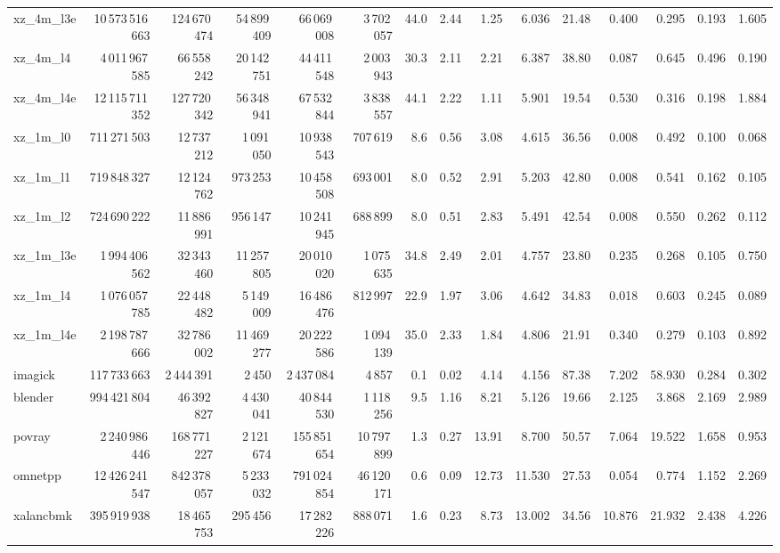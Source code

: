 \documentclass[9pt,landscape,a4paper]{article}
\begin{document}
\begin{adjustbox}{max width=\textwidth, max totalheight=0.50\textheight}
\begin{tabular}{lrrrrrrrrrrrrrr}
xz\_4m\_l3e & 10\,573\,516\,663 & 124\,670\,474 & 54\,899\,409 & 66\,069\,008 & 3\,702\,057 & 44.0 & 2.44 & 1.25 & 6.036 & 21.48 & 0.400 & 0.295 & 0.193 & 1.605 \\
xz\_4m\_l4 & 4\,011\,967\,585 & 66\,558\,242 & 20\,142\,751 & 44\,411\,548 & 2\,003\,943 & 30.3 & 2.11 & 2.21 & 6.387 & 38.80 & 0.087 & 0.645 & 0.496 & 0.190 \\
xz\_4m\_l4e & 12\,115\,711\,352 & 127\,720\,342 & 56\,348\,941 & 67\,532\,844 & 3\,838\,557 & 44.1 & 2.22 & 1.11 & 5.901 & 19.54 & 0.530 & 0.316 & 0.198 & 1.884 \\
xz\_1m\_l0 & 711\,271\,503 & 12\,737\,212 & 1\,091\,050 & 10\,938\,543 & 707\,619 & 8.6 & 0.56 & 3.08 & 4.615 & 36.56 & 0.008 & 0.492 & 0.100 & 0.068 \\
xz\_1m\_l1 & 719\,848\,327 & 12\,124\,762 & 973\,253 & 10\,458\,508 & 693\,001 & 8.0 & 0.52 & 2.91 & 5.203 & 42.80 & 0.008 & 0.541 & 0.162 & 0.105 \\
xz\_1m\_l2 & 724\,690\,222 & 11\,886\,991 & 956\,147 & 10\,241\,945 & 688\,899 & 8.0 & 0.51 & 2.83 & 5.491 & 42.54 & 0.008 & 0.550 & 0.262 & 0.112 \\
xz\_1m\_l3e & 1\,994\,406\,562 & 32\,343\,460 & 11\,257\,805 & 20\,010\,020 & 1\,075\,635 & 34.8 & 2.49 & 2.01 & 4.757 & 23.80 & 0.235 & 0.268 & 0.105 & 0.750 \\
xz\_1m\_l4 & 1\,076\,057\,785 & 22\,448\,482 & 5\,149\,009 & 16\,486\,476 & 812\,997 & 22.9 & 1.97 & 3.06 & 4.642 & 34.83 & 0.018 & 0.603 & 0.245 & 0.089 \\
xz\_1m\_l4e & 2\,198\,787\,666 & 32\,786\,002 & 11\,469\,277 & 20\,222\,586 & 1\,094\,139 & 35.0 & 2.33 & 1.84 & 4.806 & 21.91 & 0.340 & 0.279 & 0.103 & 0.892 \\
imagick & 117\,733\,663 & 2\,444\,391 & 2\,450 & 2\,437\,084 & 4\,857 & 0.1 & 0.02 & 4.14 & 4.156 & 87.38 & 7.202 & 58.930 & 0.284 & 0.302 \\
blender & 994\,421\,804 & 46\,392\,827 & 4\,430\,041 & 40\,844\,530 & 1\,118\,256 & 9.5 & 1.16 & 8.21 & 5.126 & 19.66 & 2.125 & 3.868 & 2.169 & 2.989 \\
povray & 2\,240\,986\,446 & 168\,771\,227 & 2\,121\,674 & 155\,851\,654 & 10\,797\,899 & 1.3 & 0.27 & 13.91 & 8.700 & 50.57 & 7.064 & 19.522 & 1.658 & 0.953 \\
omnetpp & 12\,426\,241\,547 & 842\,378\,057 & 5\,233\,032 & 791\,024\,854 & 46\,120\,171 & 0.6 & 0.09 & 12.73 & 11.530 & 27.53 & 0.054 & 0.774 & 1.152 & 2.269 \\
xalancbmk & 395\,919\,938 & 18\,465\,753 & 295\,456 & 17\,282\,226 & 888\,071 & 1.6 & 0.23 & 8.73 & 13.002 & 34.56 & 10.876 & 21.932 & 2.438 & 4.226 \\

\end{tabular}
\end{adjustbox}
\end{document}
